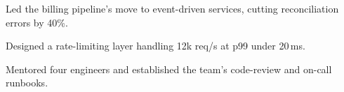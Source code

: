 \begin{bullets}
  \item Led the billing pipeline's move to event-driven services, cutting reconciliation errors by 40\%.
  \item Designed a rate-limiting layer handling 12k req/s at p99 under 20\,ms.
  \item Mentored four engineers and established the team's code-review and on-call runbooks.
\end{bullets}

